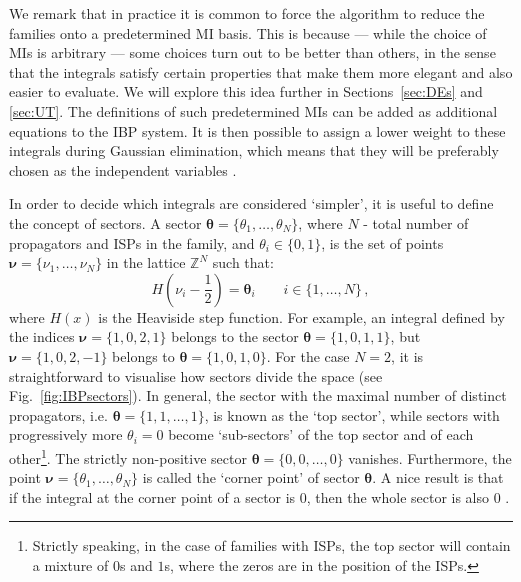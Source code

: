 \documentclass[main.tex]{subfiles}
\begin{document}
We remark that in practice it is common to force the algorithm to reduce the families onto a predetermined MI basis. This is because --- while the choice of MIs is arbitrary --- some choices turn out to be better than others, in the sense that the integrals satisfy certain properties that make them more elegant and also easier to evaluate. We will explore this idea further in Sections~\ref{sec:DEs} and \ref{sec:UT}. The definitions of such predetermined MIs can be added as additional equations to the IBP system. It is then possible to assign a lower weight to these integrals during Gaussian elimination, which means that they will be preferably chosen as the independent variables \cite{Peraro:2019svx}.

In order to decide which integrals are considered `simpler', it is useful to define the concept of sectors. A sector $\bm{\theta} = \{\theta_1, \ldots, \theta_N\}$, where $N$ - total number of propagators and ISPs in the family, and $\theta_i\in \{0, 1\}$, is the set of points $\bm{\nu} = \{\nu_1, \ldots, \nu_N\}$ in the lattice $\mathbb{Z}^N$ such that:
\begin{equation} \label{eq:sectors}
    H \left(\nu_i - \frac{1}{2} \right) = \mathbf{\theta}_i \qquad i \in \{1, \ldots, N\} \,,
\end{equation}
where $H(x)$ is the Heaviside step function. For example, an integral defined by the indices $\bm{\nu} = \{1, 0, 2, 1\}$ belongs to the sector $\bm{\theta} = \{1, 0, 1, 1\}$, but $\bm{\nu} = \{1, 0, 2, -1\}$ belongs to $\bm{\theta} = \{1, 0, 1, 0\}$. For the case $N=2$, it is straightforward to visualise how sectors divide the space (see Fig.~\ref{fig:IBPsectors}). In general, the sector with the maximal number of distinct propagators, i.e. $\bm{\theta} = \{1, 1, \ldots, 1\}$, is known as the `top sector', while sectors with progressively more $\theta_i = 0$ become `sub-sectors' of the top sector and of each other\footnote{Strictly speaking, in the case of families with ISPs, the top sector will contain a mixture of $0$s and $1$s, where the zeros are in the position of the ISPs.}. The strictly non-positive sector $\bm{\theta} = \{0, 0, \ldots, 0\}$ vanishes. Furthermore, the point $\bm{\nu} = \{\theta_1, \ldots, \theta_N\}$ is called the `corner point' of sector $\bm{\theta}$. A nice result is that if the integral at the corner point of a sector is 0, then the whole sector is also 0 \cite{Lee:2008tj}.
\end{document}
